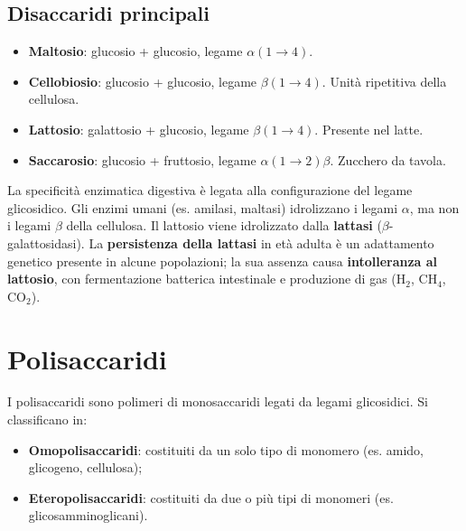 \documentclass[12pt,a4paper]{report}
\begin{document}
\subsection{Disaccaridi principali}
\begin{itemize}
\item \textbf{Maltosio}: glucosio + glucosio, legame \(\alpha(1\to4)\).
\item \textbf{Cellobiosio}: glucosio + glucosio, legame \(\beta(1\to4)\). Unità ripetitiva della cellulosa.
\item \textbf{Lattosio}: galattosio + glucosio, legame \(\beta(1\to4)\). Presente nel latte.
\item \textbf{Saccarosio}: glucosio + fruttosio, legame \(\alpha(1\to2)\beta\). Zucchero da tavola.
\end{itemize}
La specificità enzimatica digestiva è legata alla configurazione del legame glicosidico. Gli enzimi umani (es. amilasi, maltasi) idrolizzano i legami \(\alpha\), ma non i legami \(\beta\) della cellulosa. Il lattosio viene idrolizzato dalla \textbf{lattasi} (\(\beta\)-galattosidasi). La \textbf{persistenza della lattasi} in età adulta è un adattamento genetico presente in alcune popolazioni; la sua assenza causa \textbf{intolleranza al lattosio}, con fermentazione batterica intestinale e produzione di gas (\(\mathrm{H_2}\), \(\mathrm{CH_4}\), \(\mathrm{CO_2}\)).

\section{Polisaccaridi}
I polisaccaridi sono polimeri di monosaccaridi legati da legami glicosidici. Si classificano in:
\begin{itemize}
\item \textbf{Omopolisaccaridi}: costituiti da un solo tipo di monomero (es. amido, glicogeno, cellulosa);
\item \textbf{Eteropolisaccaridi}: costituiti da due o più tipi di monomeri (es. glicosamminoglicani).
\end{itemize}
\end{document}
